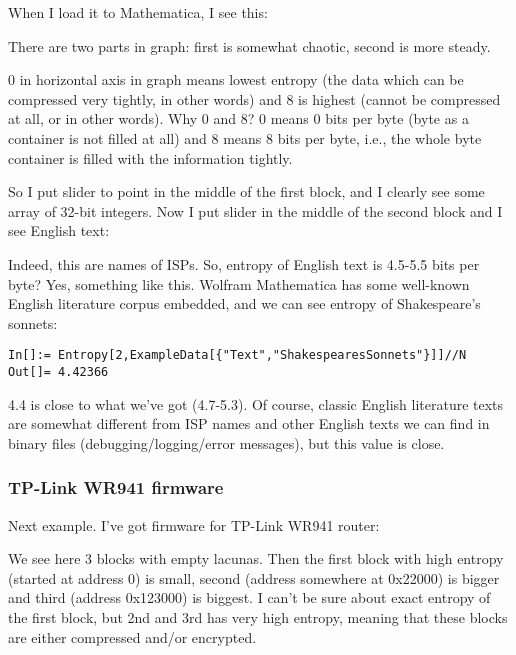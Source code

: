 When I load it to Mathematica, I see this:



There are two parts in graph: first is somewhat chaotic, second is more steady.

0 in horizontal axis in graph means lowest entropy
(the data which can be compressed very tightly,  in other words) 
and 8 is highest (cannot be compressed at all,  or  in other words).
Why 0 and 8? 0 means 0 bits per byte (byte as a container is not filled at all) 
and 8 means 8 bits per byte, i.e., the whole byte container is filled with the information tightly.

So I put slider to point in the middle of the first block, and I clearly see some array of 32-bit integers.
Now I put slider in the middle of the second block and I see English text:



Indeed, this are names of ISPs.
So, entropy of English text is 4.5-5.5 bits per byte? Yes, something like this.
Wolfram Mathematica has some well-known English literature corpus embedded, and we can see entropy of Shakespeare's sonnets:

\begin{lstlisting}[style=custommath]
In[]:= Entropy[2,ExampleData[{"Text","ShakespearesSonnets"}]]//N
Out[]= 4.42366
\end{lstlisting}

4.4 is close to what we've got (4.7-5.3). 
Of course, classic English literature texts are somewhat different from ISP names and other
English texts we can find in binary files 
(debugging/logging/error messages), but this value is close.

\subsubsection{TP-Link WR941 firmware}

Next example. I've got firmware for TP-Link WR941 router:



We see here 3 blocks with empty lacunas.
Then the first block with high entropy (started at address 0) is small, second (address somewhere at 0x22000) is bigger and third (address 0x123000) is biggest.
I can't be sure about exact entropy of the first block, but 2nd and 3rd has very high entropy, meaning that these blocks are either
compressed and/or encrypted.

